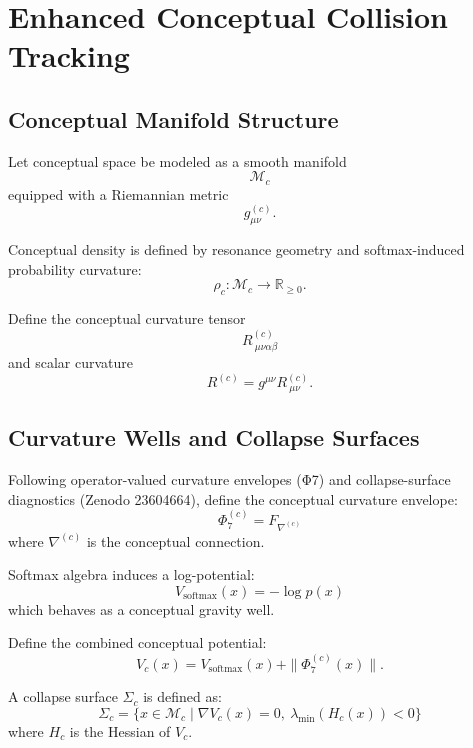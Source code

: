 
\section{Enhanced Conceptual Collision Tracking}
\label{sec:EnhancedConceptualCollisionTracking}

\subsection{Conceptual Manifold Structure}

Let conceptual space be modeled as a smooth manifold
\[
\mathcal{M}_c
\]
equipped with a Riemannian metric
\[
g^{(c)}_{\mu\nu}.
\]

Conceptual density is defined by resonance geometry and softmax-induced
probability curvature:
\[
\rho_c : \mathcal{M}_c \to \mathbb{R}_{\ge 0}.
\]

Define the conceptual curvature tensor
\[
R^{(c)}_{\ \mu\nu\alpha\beta}
\]
and scalar curvature
\[
R^{(c)} = g^{\mu\nu} R^{(c)}_{\ \mu\nu}.
\]

\subsection{Curvature Wells and Collapse Surfaces}

Following operator-valued curvature envelopes (Φ7) and collapse-surface
diagnostics (Zenodo 23604664), define the conceptual curvature envelope:
\[
\Phi_7^{(c)} = F_{\nabla^{(c)}}
\]
where $\nabla^{(c)}$ is the conceptual connection.

Softmax algebra induces a log-potential:
\[
V_{\text{softmax}}(x) = -\log p(x)
\]
which behaves as a conceptual gravity well.

Define the combined conceptual potential:
\[
V_c(x) = V_{\text{softmax}}(x) + \|\Phi_7^{(c)}(x)\|.
\]

A collapse surface $\Sigma_c$ is defined as:
\[
\Sigma_c = \{ x \in \mathcal{M}_c \mid \nabla V_c(x) = 0,\ 
\lambda_{\min}(H_c(x)) < 0 \}
\]
where $H_c$ is the Hessian of $V_c$.

